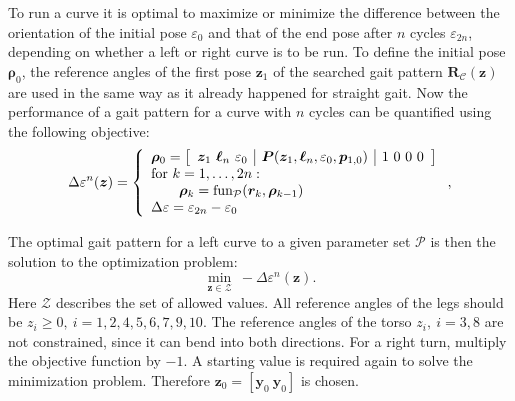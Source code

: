 \documentclass[10pt,a4paper]{article}
\begin{document}
To run a curve it is optimal to maximize or minimize the difference between the orientation of the initial pose $\varepsilon_0$ and that of the end pose after $n$ cycles $\varepsilon_{2n}$, depending on whether a left or right curve is to be run.
To define the initial pose $\bm{\rho}_0$, the reference angles of the first pose $\bm{z}_1$ of the searched gait pattern $\bm{R}_\mathcal{C}(\bm{z})$ are used in the same way as it already happened for straight gait.
Now the performance of a gait pattern for a curve with $n$ cycles can be quantified using the following objective:
\begin{equation}
\Delta\varepsilon^n(\bm{z})
 = 
\left\lbrace
\begin{array}{l}
\bm{\rho}_0 = 
\left[
\begin{array}{c|c|c}
\bm{z}_1 ~ \bm{\ell}_n ~ \varepsilon_0  & 
\bm{P}(\bm{z}_1, \bm{\ell}_n, \varepsilon_0, \bm{p}_{1,0}) & 
1~0~0~0
\end{array}
\right] \\
\textnormal{for } k = 1, \dots, 2n: \\
\qquad \bm{\rho}_k = \textnormal{fun}_{\mathcal{P}}(\bm{r}_k, \bm{\rho}_{k-1}) \\
\Delta \varepsilon = \varepsilon_{2n} - \varepsilon_0 \\
\end{array}
\right. ,
\end{equation}

The optimal gait pattern for a left curve to a given parameter set $\mathcal{P}$ is then the solution to the optimization problem:
\begin{equation}
\min_{\bm{z} \in \mathcal{Z}} ~ -\Delta\varepsilon^n(\bm{z}).
\end{equation}
Here $\mathcal{Z}$ describes the set of allowed values.
All reference angles of the legs should be $z_i\geq0,~i=1,2,4,5,6,7,9,10$. 
The reference angles of the torso $z_i,~i=3,8$ are not constrained, since it can bend into both directions.
For a right turn, multiply the objective function by $-1$.
A starting value is required again to solve the minimization problem.
Therefore $\bm{z}_0 = [\bm{y}_0~\bm{y}_0]$ is chosen.
\end{document}
